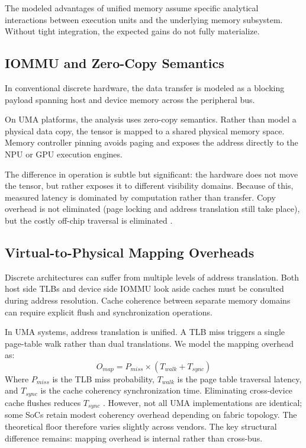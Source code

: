 \documentclass[conference]{IEEEtran}
\begin{document}
The modeled advantages of unified memory assume specific analytical interactions between execution units and the underlying memory subsystem. Without tight integration, the expected gains do not fully materialize.

\subsection{IOMMU and Zero-Copy Semantics}
In conventional discrete hardware, the data transfer is modeled as a blocking payload spanning host and device memory across the peripheral bus.

On UMA platforms, the analysis uses zero-copy semantics. Rather than model a physical data copy, the tensor is mapped to a shared physical memory space. Memory controller pinning avoids paging and exposes the address directly to the NPU or GPU execution engines. 

The difference in operation is subtle but significant: the hardware does not move the tensor, but rather exposes it to different visibility domains. Because of this, measured latency is dominated by computation rather than transfer. Copy overhead is not eliminated (page locking and address translation still take place), but the costly off-chip traversal is eliminated \cite{b24}.

\subsection{Virtual-to-Physical Mapping Overheads}
Discrete architectures can suffer from multiple levels of address translation. Both host side TLBs and device side IOMMU look aside caches must be consulted during address resolution. Cache coherence between separate memory domains can require explicit flush and synchronization operations.

In UMA systems, address translation is unified. A TLB miss triggers a single page-table walk rather than dual translations. We model the mapping overhead as:
\begin{equation}
O_{map} = P_{miss} \times (T_{walk} + T_{sync})
\end{equation}
Where $P_{miss}$ is the TLB miss probability, $T_{walk}$ is the page table traversal latency, and $T_{sync}$ is the cache coherency synchronization time. Eliminating cross-device cache flushes reduces $T_{sync}$ \cite{b19}. However, not all UMA implementations are identical; some SoCs retain modest coherency overhead depending on fabric topology. The theoretical floor therefore varies slightly across vendors. The key structural difference remains: mapping overhead is internal rather than cross-bus.
\end{document}
